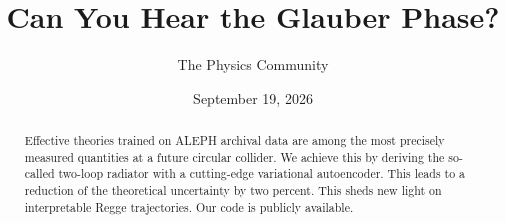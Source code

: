 \documentclass[11pt]{article}
\title{Can You Hear the Glauber Phase?}
\author{The Physics Community}
\date{September 19, 2026}
\numberwithin{equation}{section}
\theoremstyle{definition}
\theoremstyle{remark}
\begin{document}
\maketitle
\begin{abstract}
Effective theories trained on ALEPH archival data are among the most
precisely measured quantities at a future circular collider. We achieve
this by deriving the so-called two-loop radiator with a cutting-edge
variational autoencoder. This leads to a reduction of the theoretical
uncertainty by two percent. This sheds new light on interpretable Regge
trajectories. Our code is publicly available.
\end{abstract}
\tableofcontents





\nocite{*}


\end{document}
